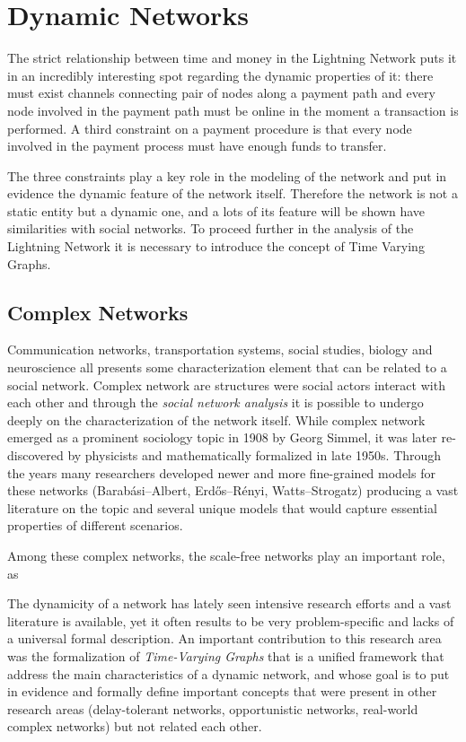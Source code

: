 
	\chapter{Dynamic Networks}
	The strict relationship between time and money in the Lightning Network puts it in an incredibly interesting spot regarding the dynamic properties of it: there must exist channels connecting pair of nodes along a payment path and every node involved in the payment path must be online in the moment a transaction is performed. A third constraint on a payment procedure is that every node involved in the payment process must have enough funds to transfer.
	
	The three constraints play a key role in the modeling of the network and put in evidence the dynamic feature of the network itself. Therefore the network is not a static entity but a dynamic one, and a lots of its feature will be shown have similarities with social networks. To proceed further in the analysis of the Lightning Network it is necessary to introduce the concept of Time Varying Graphs.
	
	\section{Complex Networks}
	
	Communication networks, transportation systems, social studies, biology and neuroscience all presents some characterization element that can be related to a social network. Complex network are structures were social actors interact with each other and through the \textit{social network analysis} it is possible to undergo deeply on the characterization of the network itself. While complex network emerged as a prominent sociology topic in 1908 by Georg Simmel, it was later re-discovered by physicists and mathematically formalized in late 1950s\cite{Simon1957}. Through the years many researchers developed newer and more fine-grained models for these networks (Barabási–Albert\cite{Barabasi1999}, Erdős–Rényi\cite{Erdos1959}, Watts–Strogatz\cite{Watts1998}) producing a vast literature on the topic and several unique models that would capture essential properties of different scenarios.
	
	Among these complex networks, the scale-free networks play an important role, as
	
	The dynamicity of a network has lately seen intensive research efforts and a vast literature is available, yet it often results to be very problem-specific and lacks of a universal formal description. An important contribution to this research area was the formalization of \textit{Time-Varying Graphs}\cite{Casteigts2012} that is a unified framework that address the main characteristics of a dynamic network, and whose goal is to put in evidence and formally define important concepts that were present in other research areas (delay-tolerant networks, opportunistic networks, real-world complex networks) but not related each other.
	
